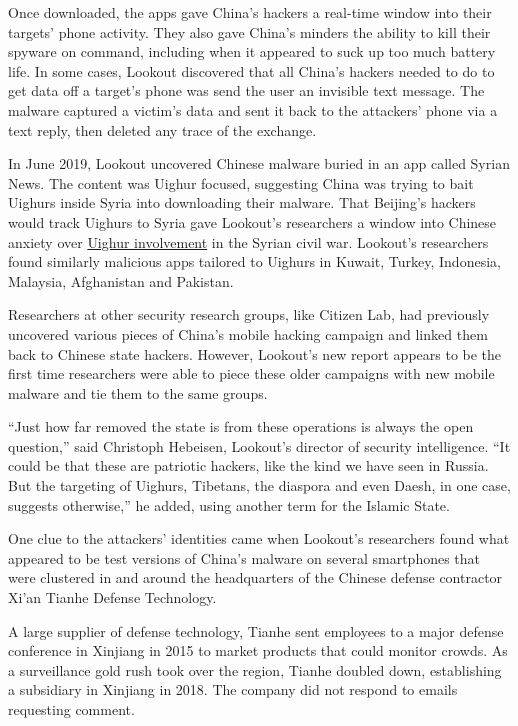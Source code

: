 Once downloaded, the apps gave China's hackers a real-time window into
their targets' phone activity. They also gave China's minders the
ability to kill their spyware on command, including when it appeared to
suck up too much battery life. In some cases, Lookout discovered that
all China's hackers needed to do to get data off a target's phone was
send the user an invisible text message. The malware captured a victim's
data and sent it back to the attackers' phone via a text reply, then
deleted any trace of the exchange.

In June 2019, Lookout uncovered Chinese malware buried in an app called
Syrian News. The content was Uighur focused, suggesting China was trying
to bait Uighurs inside Syria into downloading their malware. That
Beijing's hackers would track Uighurs to Syria gave Lookout's
researchers a window into Chinese anxiety over
\href{https://apnews.com/79d6a427b26f4eeab226571956dd256e/AP-Exclusive:-Uighurs-fighting-in-Syria-take-aim-at-China}{Uighur
involvement} in the Syrian civil war. Lookout's researchers found
similarly malicious apps tailored to Uighurs in Kuwait, Turkey,
Indonesia, Malaysia, Afghanistan and Pakistan.

Researchers at other security research groups, like Citizen Lab, had
previously uncovered various pieces of China's mobile hacking campaign
and linked them back to Chinese state hackers. However, Lookout's new
report appears to be the first time researchers were able to piece these
older campaigns with new mobile malware and tie them to the same groups.

``Just how far removed the state is from these operations is always the
open question,'' said Christoph Hebeisen, Lookout's director of security
intelligence. ``It could be that these are patriotic hackers, like the
kind we have seen in Russia. But the targeting of Uighurs, Tibetans, the
diaspora and even Daesh, in one case, suggests otherwise,'' he added,
using another term for the Islamic State.

One clue to the attackers' identities came when Lookout's researchers
found what appeared to be test versions of China's malware on several
smartphones that were clustered in and around the headquarters of the
Chinese defense contractor Xi'an Tianhe Defense Technology.

A large supplier of defense technology, Tianhe sent employees to a major
defense conference in Xinjiang in 2015 to market products that could
monitor crowds. As a surveillance gold rush took over the region, Tianhe
doubled down, establishing a subsidiary in Xinjiang in 2018. The company
did not respond to emails requesting comment.

